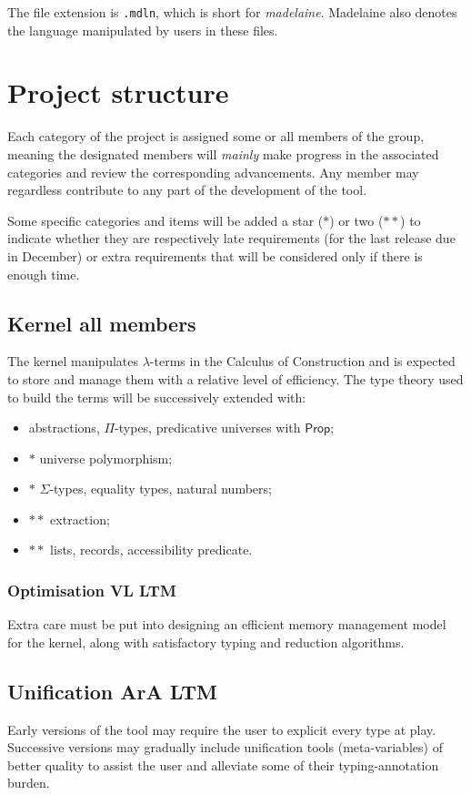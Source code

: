 \documentclass[twocolumn]{article}
\newcommand{\members}[1]{\texorpdfstring{\hfill\scriptsize #1}{}}
\begin{document}
The file extension is \texttt{.mdln}, which is short for \emph{madelaine}.
Madelaine also denotes the language manipulated by users in these files.


\section{Project structure}
Each category of the project is assigned some or all members of the group,
meaning the designated members will \emph{mainly} make progress in the associated categories
and review the corresponding advancements. Any member may regardless contribute to any part
of the development of the tool.

Some specific categories and items will be added a star (\(*\)) or two (\(**\)) to
indicate whether they are respectively late requirements (for the last release
due in December)
or extra requirements that will be considered only if there is enough time.


\subsection{Kernel \members{all members}}
The kernel manipulates \(\lambda\)-terms in the Calculus of Construction and is
expected to store and manage them with a relative level of efficiency.
The type theory used to build the terms will be successively extended with:
\begin{itemize}
  \item abstractions, \(\Pi\)-types, predicative universes with \(\mathsf{Prop}\);
  \item \(*\) universe polymorphism;
  \item \(*\) \(\Sigma\)-types, equality types, natural numbers;
  \item \(**\) extraction;
  \item \(**\) lists, records, accessibility predicate.
\end{itemize}


\subsubsection{Optimisation \members{VL LTM}}
Extra care must be put into designing an efficient memory management model for
the kernel, along with satisfactory typing and reduction algorithms.


\subsection{Unification \members{ArA LTM}}
Early versions of the tool may require the user to explicit every type at play.
Successive versions may gradually include unification tools (meta-variables)
of better quality to assist the user and alleviate some of their typing-annotation
burden.
\end{document}

